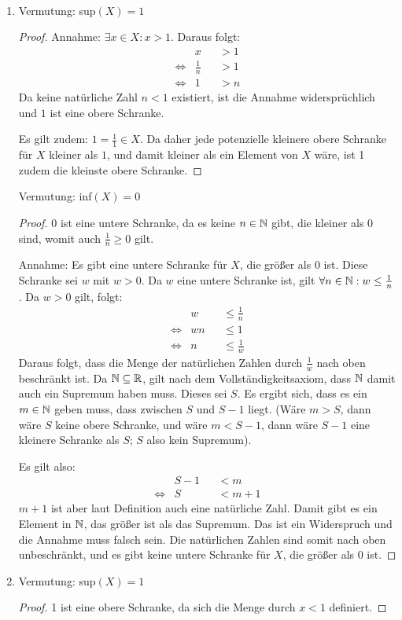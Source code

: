 \bigskip

\begin{lsg}\mbox{ }
\begin{enumerate}[label=$\mathrm{(\roman*)}$, ref=$\mathrm{\roman*}$]
\item 
Vermutung: sup$(X)=1$
\begin{proof}
Annahme: $\exists x \in X:x>1$. Daraus folgt:
\begin{align*}
&x&&>1 \\
\iff &\frac{1}{n}&&>1 \\
\iff &1&&>n 
\end{align*}  
Da keine natürliche Zahl $n<1$ existiert, ist die Annahme widersprüchlich und $1$ ist eine obere Schranke.

Es gilt zudem: $1=\frac{1}{1}\in X$. Da daher jede potenzielle kleinere obere Schranke für $X$ kleiner als $1$, und damit kleiner als ein Element von $X$ wäre, ist 1 zudem die kleinste obere Schranke.
\end{proof}

Vermutung: inf$(X)=0$
\begin{proof}
0 ist eine untere Schranke, da es keine $n \in \mathbb{N}$ gibt, die kleiner als 0 sind, womit auch $\frac{1}{n} \geq 0$ gilt.

Annahme: Es gibt eine untere Schranke für $X$, die größer als 0 ist. Diese Schranke sei $w$ mit $w>0$. Da $w$ eine untere Schranke ist, gilt $\forall n\in \mathbb{N}: w \leq \frac{1}{n}$. Da $w>0$ gilt, folgt:
\begin{align*}
&w &&\leq \frac{1}{n} \\
\iff &wn &&\leq 1 \\
\iff &n &&\leq \frac{1}{w} 
\end{align*}
Daraus folgt, dass die Menge der natürlichen Zahlen durch $\frac{1}{w}$ nach oben beschränkt ist.
Da $\mathbb{N} \subseteq \mathbb{R}$, gilt nach dem Vollständigkeitsaxiom, dass $\mathbb{N}$ damit auch ein Supremum haben muss. Dieses sei $S$. Es ergibt sich, dass es ein $m \in \mathbb{N}$ geben muss, dass zwischen $S$ und $S-1$ liegt. (Wäre $m>S$, dann wäre $S$ keine obere Schranke, und wäre $m<S-1$, dann wäre $S-1$ eine kleinere Schranke als $S$; $S$ also kein Supremum).

Es gilt also:
\begin{align*}
&S-1&&<m \\
\iff &S&&<m+1 
\end{align*}
$m+1$ ist aber laut Definition auch eine natürliche Zahl. Damit gibt es ein Element in $\mathbb{N}$, das größer ist als das Supremum. Das ist ein Widerspruch und die Annahme muss falsch sein. Die natürlichen Zahlen sind somit nach oben unbeschränkt, und es gibt keine untere Schranke für $X$, die größer als 0 ist. 
\end{proof}
\item 
Vermutung: sup$(X)=1$
\begin{proof}
1 ist eine obere Schranke, da sich die Menge durch $x<1$ definiert.


\end{proof}
\end{enumerate}
\end{lsg}
